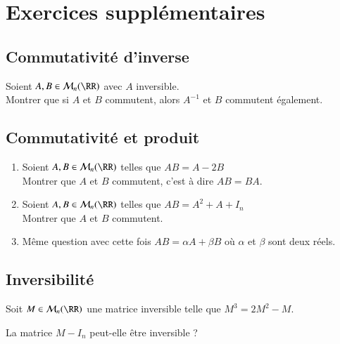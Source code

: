 \documentclass[oneside,12pt]{article}          %
\begin{document}
\section{Exercices supplémentaires}

\subsection{Commutativité d'inverse}
Soient $A,B\in\mathcal{M}_n(\RR)$ avec $A$ inversible.\\
Montrer que si $A$ et $B$ commutent, alors $A^{-1}$ et $B$ commutent également.



\subsection{Commutativité et produit}
\begin{enumerate}
    \item Soient $A,B\in\mathcal{M}_n(\RR)$ telles que $AB=A-2B$\\ 
    Montrer que $A$ et $B$ commutent, c'est à dire $AB=BA$.
    \item Soient $A,B\in\mathcal{M}_n(\RR)$ telles que $AB=A^2+A+I_n$ \\
	Montrer que $A$ et $B$ commutent.
    \item Même question avec cette fois $AB=\alpha A + \beta B$ où $\alpha$ et $\beta$ sont deux réels.
\end{enumerate}



\subsection{Inversibilité}
Soit $M\in\mathcal{M}_n(\RR)$ une matrice inversible telle que $M^3=2M^2-M$.

La matrice $M-I_n$ peut-elle être inversible ?
\end{document}
